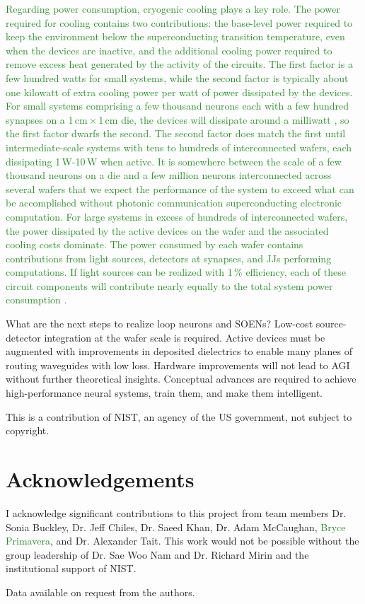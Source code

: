 \documentclass[twocolumn]{article}
\begin{document}
\textcolor{ForestGreen}{Regarding power consumption, cryogenic cooling plays a key role. The power required for cooling  contains two contributions: the base-level power required to keep the environment below the superconducting transition temperature, even when the devices are inactive, and the additional cooling power required to remove excess heat generated by the activity of the circuits. The first factor is a few hundred watts for small systems, while the second factor is typically about one kilowatt of extra cooling power per watt of power dissipated by the devices. For small systems comprising a few thousand neurons each with a few hundred synapses on a 1\,cm\,$\times$\,1\,cm die, the devices will dissipate around a milliwatt \cite{sh2019}, so the first factor dwarfs the second. The second factor does match the first until intermediate-scale systems with tens to hundreds of interconnected wafers, each dissipating 1\,W-10\,W when active. It is somewhere between the scale of a few thousand neurons on a die and a few million neurons interconnected across several wafers that we expect the performance of the system to exceed what can be accomplished without photonic communication superconducting electronic computation. For large systems in excess of hundreds of interconnected wafers, the power dissipated by the active devices on the wafer and the associated cooling costs dominate. The power consumed by each wafer contains contributions from light sources, detectors at synapses, and JJs performing computations. If light sources can be realized with 1\,\% efficiency, each of these circuit components will contribute nearly equally to the total system power consumption \cite{sh2020}.}

What are the next steps to realize loop neurons and SOENs? Low-cost source-detector integration at the wafer scale is required. Active devices must be augmented with improvements in deposited dielectrics to enable many planes of routing waveguides with low loss. Hardware improvements will not lead to AGI without further theoretical insights. Conceptual advances are required to achieve high-performance neural systems, train them, and make them intelligent.

\vspace{2em}
This is a contribution of NIST, an agency of the US government, not subject to copyright.

\section{\label{sec:acknowledgements}Acknowledgements}
I acknowledge significant contributions to this project from team members Dr. Sonia Buckley, Dr. Jeff Chiles, Dr. Saeed Khan, Dr. Adam McCaughan, \textcolor{ForestGreen}{Bryce Primavera}, and Dr. Alexander Tait. This work would not be possible without the group leadership of Dr. Sae Woo Nam and Dr. Richard Mirin and the institutional support of NIST.

\vspace{2em}
Data available on request from the authors.



\end{document}
